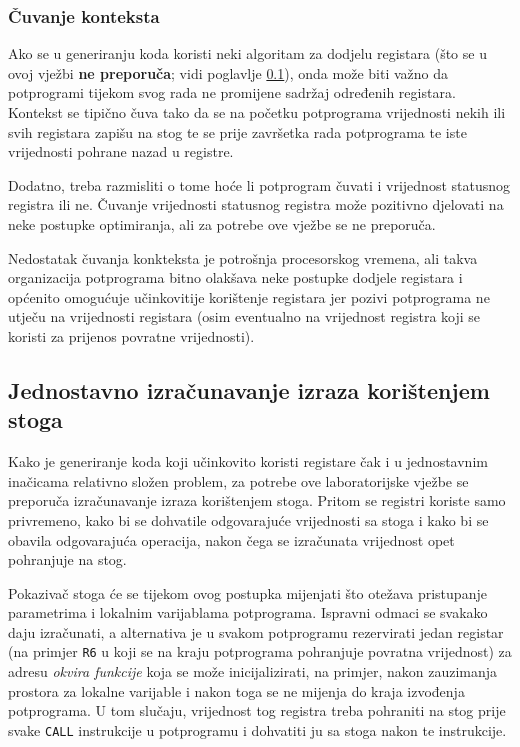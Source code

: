\documentclass[times, 12pt, utf8]{book}
\begin{document}
\subsubsection{Čuvanje konteksta}
Ako se u generiranju koda koristi neki algoritam za dodjelu registara (što se u ovoj vježbi \textbf{ne preporuča}; vidi poglavlje \ref{sec:izracunavanje_izraza}), onda može biti važno da potprogrami tijekom svog rada ne promijene sadržaj određenih registara.
Kontekst se tipično čuva tako da se na početku potprograma vrijednosti nekih ili svih registara zapišu na stog te se prije završetka rada potprograma te iste vrijednosti pohrane nazad u registre.

Dodatno, treba razmisliti o tome hoće li potprogram čuvati i vrijednost statusnog registra ili ne.
Čuvanje vrijednosti statusnog registra može pozitivno djelovati na neke postupke optimiranja, ali za potrebe ove vježbe se ne preporuča.

Nedostatak čuvanja konkteksta je potrošnja procesorskog vremena, ali takva organizacija potprograma bitno olakšava neke postupke dodjele registara i općenito omogućuje učinkovitije korištenje registara jer pozivi potprograma ne utječu na vrijednosti registara (osim eventualno na vrijednost registra koji se koristi za prijenos povratne vrijednosti).

\subsection{Jednostavno izračunavanje izraza korištenjem stoga}\label{sec:izracunavanje_izraza}
Kako je generiranje koda koji učinkovito koristi registare čak i u jednostavnim inačicama relativno složen problem, za potrebe ove laboratorijske vježbe se preporuča izračunavanje izraza korištenjem stoga.
Pritom se registri koriste samo privremeno, kako bi se dohvatile odgovarajuće vrijednosti sa stoga i kako bi se obavila odgovarajuća operacija, nakon čega se izračunata vrijednost opet pohranjuje na stog.

Pokazivač stoga će se tijekom ovog postupka mijenjati što otežava pristupanje parametrima i lokalnim varijablama potprograma.
Ispravni odmaci se svakako daju izračunati, a alternativa je u svakom potprogramu rezervirati jedan registar (na primjer \verb|R6| u koji se na kraju potprograma pohranjuje povratna vrijednost) za adresu \emph{okvira funkcije} koja se može inicijalizirati, na primjer, nakon zauzimanja prostora za lokalne varijable i nakon toga se ne mijenja do kraja izvođenja potprograma.
U tom slučaju, vrijednost tog registra treba pohraniti na stog prije svake \verb|CALL| instrukcije u potprogramu i dohvatiti ju sa stoga nakon te instrukcije.
\end{document}
